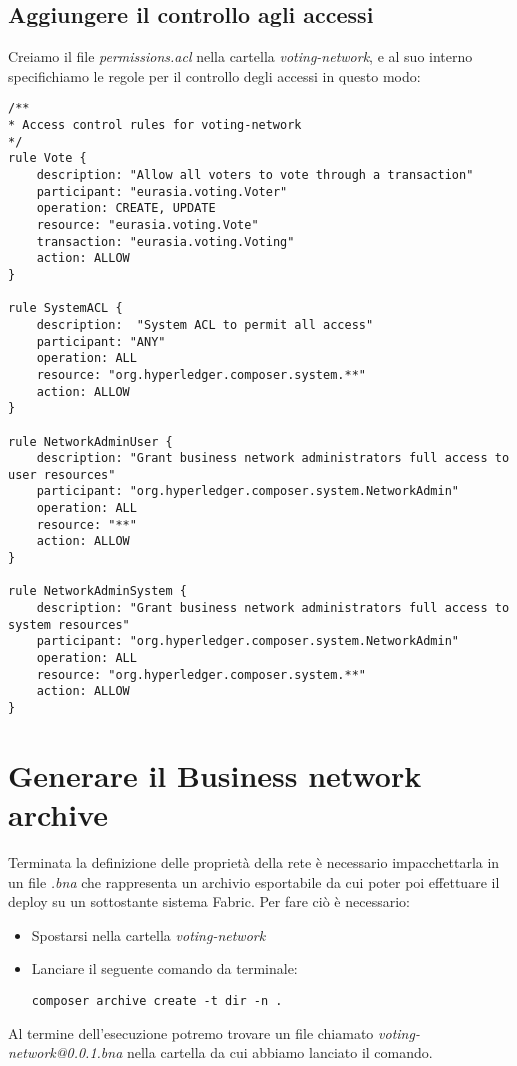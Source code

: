 	\subsection{Aggiungere il controllo agli accessi}
		Creiamo il file \emph{permissions.acl} nella cartella \emph{voting-network}, e al suo interno specifichiamo le regole per il controllo degli accessi in questo modo:
\begin{lstlisting}
/**
* Access control rules for voting-network
*/
rule Vote {
	description: "Allow all voters to vote through a transaction"
	participant: "eurasia.voting.Voter"
	operation: CREATE, UPDATE
	resource: "eurasia.voting.Vote"
	transaction: "eurasia.voting.Voting"
	action: ALLOW
}

rule SystemACL {
	description:  "System ACL to permit all access"
	participant: "ANY"
	operation: ALL
	resource: "org.hyperledger.composer.system.**"
	action: ALLOW
}

rule NetworkAdminUser {
	description: "Grant business network administrators full access to user resources"
	participant: "org.hyperledger.composer.system.NetworkAdmin"
	operation: ALL
	resource: "**"
	action: ALLOW
}

rule NetworkAdminSystem {
	description: "Grant business network administrators full access to system resources"
	participant: "org.hyperledger.composer.system.NetworkAdmin"
	operation: ALL
	resource: "org.hyperledger.composer.system.**"
	action: ALLOW
}
\end{lstlisting}

\section{Generare il Business network archive}
	Terminata la definizione delle proprietà della rete è necessario impacchettarla in un file \emph{.bna} che rappresenta un archivio esportabile da cui poter poi effettuare il deploy su un sottostante sistema Fabric.
	Per fare ciò è necessario:
	\begin{itemize}
		\item Spostarsi nella cartella \emph{voting-network}
		\item Lanciare il seguente comando da terminale:
			\begin{lstlisting}
composer archive create -t dir -n .
			\end{lstlisting}
	\end{itemize}
	Al termine dell'esecuzione potremo trovare un file chiamato \emph{voting-network@0.0.1.bna} nella cartella da cui abbiamo lanciato il comando.